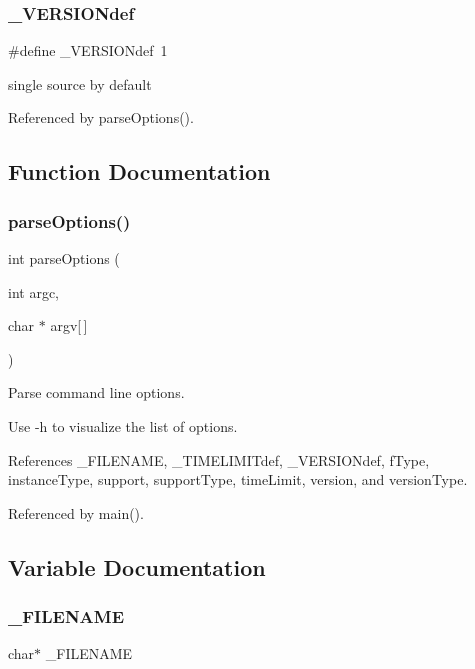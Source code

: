 \subsubsection{\+\_\+\+V\+E\+R\+S\+I\+O\+Ndef}
{\footnotesize\ttfamily \#define \+\_\+\+V\+E\+R\+S\+I\+O\+Ndef~1}



single source by default 



Referenced by parse\+Options().



\subsection{Function Documentation}
\mbox{\label{options_8cpp_a8ddddf1e9743696419ce3747d49a54e6}} 
\subsubsection{parse\+Options()}
{\footnotesize\ttfamily int parse\+Options (\begin{DoxyParamCaption}\item[{int}]{argc,  }\item[{char $\ast$}]{argv[$\,$] }\end{DoxyParamCaption})}



Parse command line options. 

Use -\/h to visualize the list of options. 

References \+\_\+\+F\+I\+L\+E\+N\+A\+ME, \+\_\+\+T\+I\+M\+E\+L\+I\+M\+I\+Tdef, \+\_\+\+V\+E\+R\+S\+I\+O\+Ndef, f\+Type, instance\+Type, support, support\+Type, time\+Limit, version, and version\+Type.



Referenced by main().



\subsection{Variable Documentation}
\mbox{\label{options_8cpp_ab602cefd46d5e616c87e034f4db68854}} 
\subsubsection{\+\_\+\+F\+I\+L\+E\+N\+A\+ME}
{\footnotesize\ttfamily char$\ast$ \+\_\+\+F\+I\+L\+E\+N\+A\+ME}



